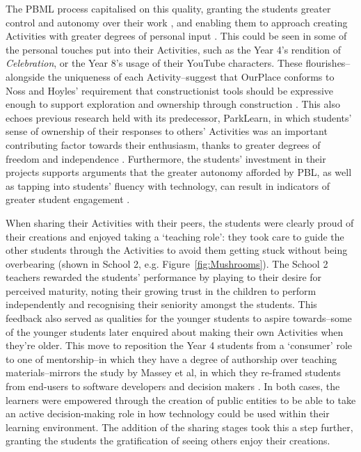 The PBML process capitalised on this quality, granting the students greater control and autonomy over their work \cite{Noss2017, Wurdinger2007}, and enabling them to approach creating Activities with greater degrees of personal input \cite{Richardson2017}. This could be seen in some of the personal touches put into their Activities, such as the Year 4's rendition of \textit{Celebration}, or the Year 8's usage of their YouTube characters. These flourishes--alongside the uniqueness of each Activity--suggest that OurPlace conforms to Noss and Hoyles' requirement that constructionist tools should be expressive enough to support exploration and ownership through construction \cite{Noss2017}. This also echoes previous research held with its predecessor, ParkLearn, in which students' sense of ownership of their responses to others' Activities was an important contributing factor towards their enthusiasm, thanks to greater degrees of freedom and independence \cite{Richardson2018}. Furthermore, the students' investment in their projects supports arguments that the greater autonomy afforded by PBL, as well as tapping into students' fluency with technology, can result in indicators of greater student engagement \cite{Wurdinger2007, Bell2010}.

When sharing their Activities with their peers, the students were clearly proud of their creations and enjoyed taking a `teaching role': they took care to guide the other students through the Activities to avoid them getting stuck without being overbearing (shown in School 2, e.g. Figure~\ref{fig:Mushrooms}). The School 2 teachers rewarded the students' performance by playing to their desire for perceived maturity, noting their growing trust in the children to perform independently and recognising their seniority amongst the students. This feedback also served as qualities for the younger students to aspire towards--some of the younger students later enquired about making their own Activities when they're older. This move to reposition the Year 4 students from a `consumer' role to one of mentorship--in which they have a degree of authorship over teaching materials--mirrors the study by Massey et al, in which they re-framed students from end-users to software developers and decision makers \cite{Massey2006}. In both cases, the learners were empowered through the creation of public entities to be able to take an active decision-making role in how technology could be used within their learning environment. The addition of the sharing stages took this a step further, granting the students the gratification of seeing others enjoy their creations.
 
